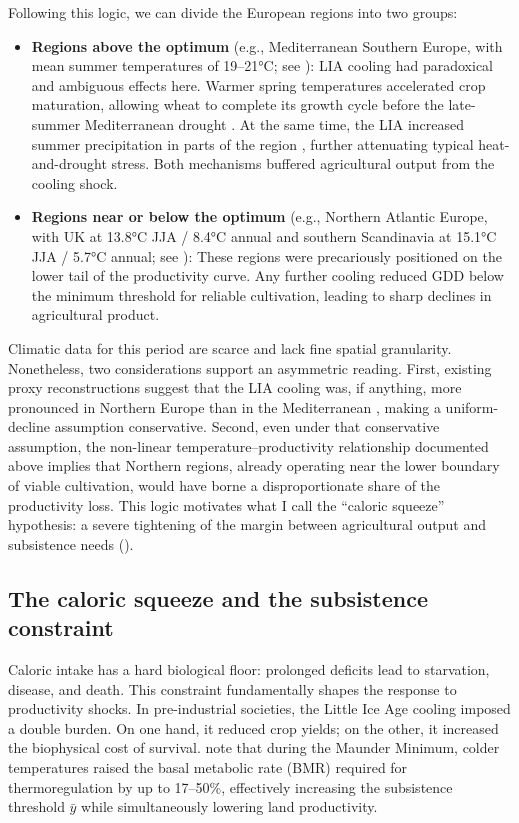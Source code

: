 \documentclass[11pt,a4paper]{article}
\begin{document}
Following this logic, we can divide the European regions into two groups:
\begin{itemize}
  \item \textbf{Regions above the optimum} (e.g., Mediterranean Southern Europe, with mean summer temperatures of 19--21°C; see ): LIA cooling had paradoxical and ambiguous effects here. Warmer spring temperatures accelerated crop maturation, allowing wheat to complete its growth cycle before the late-summer Mediterranean drought \parencite{OddoErdkamp2025}. At the same time, the LIA increased summer precipitation in parts of the region \parencite{Luterbacher2004, Wanner2022}, further attenuating typical heat-and-drought stress. Both mechanisms buffered agricultural output from the cooling shock.
  \item \textbf{Regions near or below the optimum} (e.g., Northern Atlantic Europe, with UK at 13.8°C JJA / 8.4°C annual and southern Scandinavia at 15.1°C JJA / 5.7°C annual; see ): These regions were precariously positioned on the lower tail of the productivity curve. Any further cooling reduced GDD below the minimum threshold for reliable cultivation, leading to sharp declines in agricultural product.
\end{itemize}

Climatic data for this period are scarce and lack fine spatial granularity. Nonetheless, two considerations support an asymmetric reading. First, existing proxy reconstructions suggest that the LIA cooling was, if anything, more pronounced in Northern Europe than in the Mediterranean \parencite{Neukom2019, Luterbacher2004}, making a uniform-decline assumption conservative. Second, even under that conservative assumption, the non-linear temperature--productivity relationship documented above implies that Northern regions, already operating near the lower boundary of viable cultivation, would have borne a disproportionate share of the productivity loss. This logic motivates what I call the ``caloric squeeze'' hypothesis: a severe tightening of the margin between agricultural output and subsistence needs ().

\subsection*{The caloric squeeze and the subsistence constraint}
Caloric intake has a hard biological floor: prolonged deficits lead to starvation, disease, and death. This constraint fundamentally shapes the response to productivity shocks. In pre-industrial societies, the Little Ice Age cooling imposed a double burden. On one hand, it reduced crop yields; on the other, it increased the biophysical cost of survival. \textcite{MartinezGonzalez2020} note that during the Maunder Minimum, colder temperatures raised the basal metabolic rate (BMR) required for thermoregulation by up to 17--50\%, effectively increasing the subsistence threshold \(\bar{y}\) while simultaneously lowering land productivity.
\end{document}

